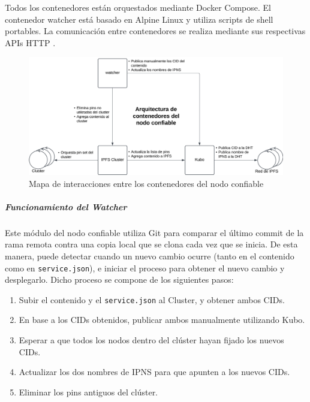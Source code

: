 Todos los contenedores están orquestados mediante Docker Compose. El contenedor watcher está basado en Alpine Linux y utiliza scripts de shell portables. La comunicación entre contenedores se realiza mediante sus respectivas APIs HTTP \cite{kubo-api} \cite{cluster-api}.

\begin{figure}[h!]
    \centering
    \includegraphics[width=1\linewidth]{img/solucion-ipfs/contenedores-trusted-peer.png}
    \caption{Mapa de interacciones entre los contenedores del nodo confiable}
    \label{fig:contenedores-trusted-peer}
\end{figure}

\subparagraph{Funcionamiento del Watcher} Este módulo del nodo confiable utiliza Git para comparar el último commit de la rama remota contra una copia local que se clona cada vez que se inicia. De esta manera, puede detectar cuando un nuevo cambio ocurre (tanto en el contenido como en \texttt{service.json}), e iniciar el proceso para obtener el nuevo cambio y desplegarlo. Dicho proceso se compone de los siguientes pasos:
\begin{enumerate}
    \item Subir el contenido y el \texttt{service.json} al Cluster, y obtener ambos CIDs.
    \item En base a los CIDs obtenidos, publicar ambos manualmente utilizando Kubo.
    \item Esperar a que todos los nodos dentro del clúster hayan fijado los nuevos CIDs.
    \item Actualizar los dos nombres de IPNS para que apunten a los nuevos CIDs.
    \item Eliminar los pins antiguos del clúster.
\end{enumerate}

